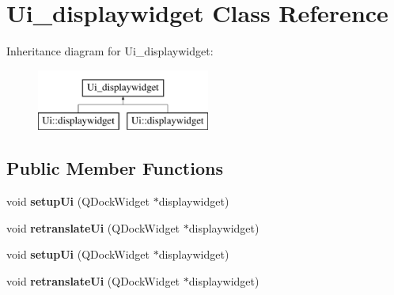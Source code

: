 \hypertarget{class_ui__displaywidget}{\section{\-Ui\-\_\-displaywidget \-Class \-Reference}
\label{class_ui__displaywidget}
}
\-Inheritance diagram for \-Ui\-\_\-displaywidget\-:\begin{figure}[H]
\begin{center}
\leavevmode
\includegraphics[height=2.000000cm]{class_ui__displaywidget}
\end{center}
\end{figure}
\subsection*{\-Public \-Member \-Functions}
\begin{DoxyCompactItemize}
\item 
\hypertarget{class_ui__displaywidget_ab33a86bf19d3534181da1df3bbe36938}{void {\bfseries setup\-Ui} (\-Q\-Dock\-Widget $\ast$displaywidget)}\label{class_ui__displaywidget_ab33a86bf19d3534181da1df3bbe36938}

\item 
\hypertarget{class_ui__displaywidget_a753ae2e93378d9ee6987c59d973dc19a}{void {\bfseries retranslate\-Ui} (\-Q\-Dock\-Widget $\ast$displaywidget)}\label{class_ui__displaywidget_a753ae2e93378d9ee6987c59d973dc19a}

\item 
\hypertarget{class_ui__displaywidget_ab33a86bf19d3534181da1df3bbe36938}{void {\bfseries setup\-Ui} (\-Q\-Dock\-Widget $\ast$displaywidget)}\label{class_ui__displaywidget_ab33a86bf19d3534181da1df3bbe36938}

\item 
\hypertarget{class_ui__displaywidget_a753ae2e93378d9ee6987c59d973dc19a}{void {\bfseries retranslate\-Ui} (\-Q\-Dock\-Widget $\ast$displaywidget)}\label{class_ui__displaywidget_a753ae2e93378d9ee6987c59d973dc19a}

\end{DoxyCompactItemize}
